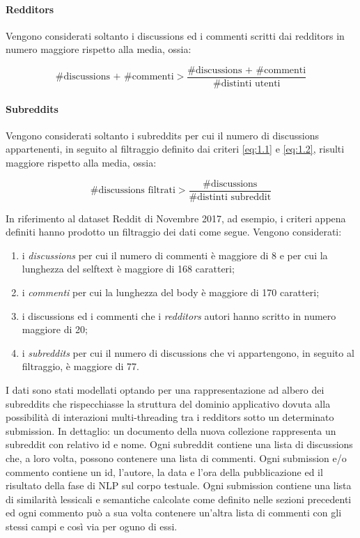 \paragraph{Redditors}
Vengono considerati soltanto i discussions ed i commenti scritti dai redditors in numero maggiore rispetto alla media, ossia:

\begin{equation}
\text{\# discussions + \# commenti}>\frac{\text{\# discussions + \# commenti}}{\text{\# distinti utenti}}
\end{equation}

\paragraph{Subreddits}
Vengono considerati soltanto i subreddits per cui il numero di discussions appartenenti, in seguito al filtraggio definito dai criteri \eqref{eq:1.1} e \eqref{eq:1.2}, risulti maggiore rispetto alla media, ossia:

\begin{equation}
\text{\# discussions filtrati}>\frac{\text{\# discussions}}{\text{\# distinti subreddit}}
\end{equation}

In riferimento al dataset Reddit di Novembre 2017, ad esempio, i criteri appena definiti hanno prodotto un filtraggio dei dati come segue. Vengono considerati:

\begin{enumerate}[label=(\roman*)]

\item 
i \textit{discussions} per cui il numero di commenti {\`e} maggiore di 8 e per cui la lunghezza del selftext {\`e} maggiore di 168 caratteri;

\item
i \textit{commenti} per cui la lunghezza del body {\`e} maggiore di 170 caratteri;

\item 
i discussions ed i commenti che i \textit{redditors} autori hanno scritto in numero maggiore di 20;

\item
i \textit{subreddits} per cui il numero di discussions che vi appartengono, in seguito al filtraggio, {\`e} maggiore di 77.

\end{enumerate}

I dati sono stati modellati optando per una rappresentazione ad albero dei subreddits che rispecchiasse la struttura del dominio applicativo dovuta alla possibilit{\`a} di interazioni multi-threading tra i redditors sotto un determinato submission. In dettaglio: un documento della nuova collezione rappresenta un subreddit con relativo id e nome. Ogni subreddit contiene una lista di discussions che, a loro volta, possono contenere una lista di commenti. Ogni submission e/o commento contiene un id, l'autore, la data e l'ora della pubblicazione ed il risultato della fase di NLP sul corpo testuale. Ogni submission contiene una lista di similarit{\`a} lessicali e semantiche calcolate come definito nelle sezioni precedenti ed ogni commento pu{\`o} a sua volta contenere un'altra lista di commenti con gli stessi campi e cos{\`i} via per oguno di essi.

